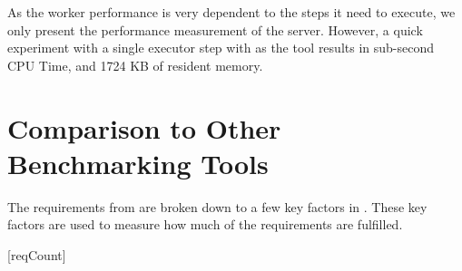 As the worker performance is very dependent to the steps it need to execute, we only present the performance measurement of the server.
However, a quick experiment with a single executor step with  as the tool results in sub-second CPU Time, and 1724 KB of resident memory.


\section{Comparison to Other Benchmarking Tools}
\label{sec:eval.comparison}

The requirements from  are broken down to a few key factors in .
These key factors are used to measure how much of the requirements are fulfilled.

[reqCount]
\newcommand{\reqLabel}[1]{
	\setcounter{reqFactorCount}{0}
	\addtocounter{reqCount}{1}
	\arabic{reqCount}.
	#1
}
\newcommand{\reqFactor}[1]{
	\addtocounter{reqFactorCount}{1}
	(\alph{reqFactorCount}) #1
}

